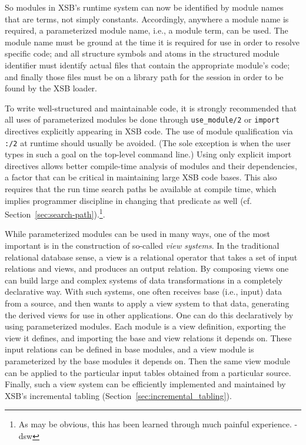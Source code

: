 So modules in XSB's runtime system can now be identified by module names
that are terms, not simply constants. Accordingly, anywhere a module
name is required, a parameterized module name, i.e., a module term,
can be used.  The module name must be ground at the time it is
required for use in order to resolve specific code; and all structure
symbols and atoms in the structured module identifier must identify
actual files that contain the appropriate module's code; and finally
those files must be on a library path for the session in order to be
found by the XSB loader.

To write well-structured and maintainable code, it is strongly
recommended that all uses of parameterized modules be done through
{\tt use\_module/2} or {\tt import} directives explicitly appearing in
XSB code.  The use of module qualification via {\tt :/2} at runtime
should usually be avoided.  (The sole exception is when the user types
in such a goal on the top-level command line.)  Using only explicit
import directives allows better compile-time analysis of modules and
their dependencies, a factor that can be critical in maintaining large
XSB code bases. This also requires that the run time search paths be
available at compile time, which implies programmer discipline in
changing that predicate as well
(cf. Section~\ref{sec:search-path}).\footnote{As may be obvious, this
  has been learned through much painful experience. -dsw}.

While parameterized modules can be used in many ways, one of the most
important is in the construction of so-called {\em view systems}.  In
the traditional relational database sense, a view is a relational
operator that takes a set of input relations and views, and produces
an output relation.  By composing views one can build large and
complex systems of data transformations in a completely declarative
way.  With such systems, one often receives base (i.e., input) data
from a source, and then wants to apply a view system to that data,
generating the derived views for use in other applications.  One can
do this declaratively by using parameterized modules.  Each module is
a view definition, exporting the view it defines, and importing the
base and view relations it depends on.  These input relations can be
defined in base modules, and a view module is parameterized by the
base modules it depends on.  Then the same view module can be applied
to the particular input tables obtained from a particular source.
Finally, such a view system can be efficiently implemented and
maintained by XSB's incremental tabling
(Section~\ref{sec:incremental_tabling}).

